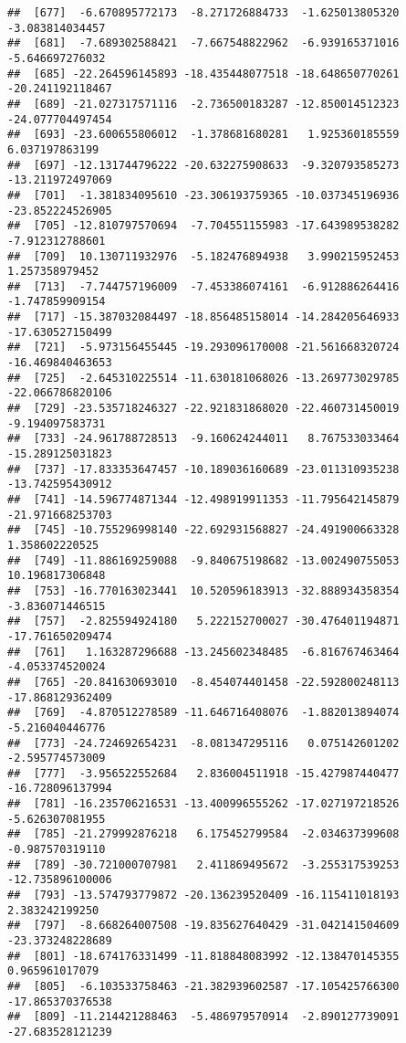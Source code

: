 \documentclass[
]{article}
\begin{document}
\begin{verbatim}
##  [677]  -6.670895772173  -8.271726884733  -1.625013805320  -3.083814034457
##  [681]  -7.689302588421  -7.667548822962  -6.939165371016  -5.646697276032
##  [685] -22.264596145893 -18.435448077518 -18.648650770261 -20.241192118467
##  [689] -21.027317571116  -2.736500183287 -12.850014512323 -24.077704497454
##  [693] -23.600655806012  -1.378681680281   1.925360185559   6.037197863199
##  [697] -12.131744796222 -20.632275908633  -9.320793585273 -13.211972497069
##  [701]  -1.381834095610 -23.306193759365 -10.037345196936 -23.852224526905
##  [705] -12.810797570694  -7.704551155983 -17.643989538282  -7.912312788601
##  [709]  10.130711932976  -5.182476894938   3.990215952453   1.257358979452
##  [713]  -7.744757196009  -7.453386074161  -6.912886264416  -1.747859909154
##  [717] -15.387032084497 -18.856485158014 -14.284205646933 -17.630527150499
##  [721]  -5.973156455445 -19.293096170008 -21.561668320724 -16.469840463653
##  [725]  -2.645310225514 -11.630181068026 -13.269773029785 -22.066786820106
##  [729] -23.535718246327 -22.921831868020 -22.460731450019  -9.194097583731
##  [733] -24.961788728513  -9.160624244011   8.767533033464 -15.289125031823
##  [737] -17.833353647457 -10.189036160689 -23.011310935238 -13.742595430912
##  [741] -14.596774871344 -12.498919911353 -11.795642145879 -21.971668253703
##  [745] -10.755296998140 -22.692931568827 -24.491900663328   1.358602220525
##  [749] -11.886169259088  -9.840675198682 -13.002490755053  10.196817306848
##  [753] -16.770163023441  10.520596183913 -32.888934358354  -3.836071446515
##  [757]  -2.825594924180   5.222152700027 -30.476401194871 -17.761650209474
##  [761]   1.163287296688 -13.245602348485  -6.816767463464  -4.053374520024
##  [765] -20.841630693010  -8.454074401458 -22.592800248113 -17.868129362409
##  [769]  -4.870512278589 -11.646716408076  -1.882013894074  -5.216040446776
##  [773] -24.724692654231  -8.081347295116   0.075142601202  -2.595774573009
##  [777]  -3.956522552684   2.836004511918 -15.427987440477 -16.728096137994
##  [781] -16.235706216531 -13.400996555262 -17.027197218526  -5.626307081955
##  [785] -21.279992876218   6.175452799584  -2.034637399608  -0.987570319110
##  [789] -30.721000707981   2.411869495672  -3.255317539253 -12.735896100006
##  [793] -13.574793779872 -20.136239520409 -16.115411018193   2.383242199250
##  [797]  -8.668264007508 -19.835627640429 -31.042141504609 -23.373248228689
##  [801] -18.674176331499 -11.818848083992 -12.138470145355   0.965961017079
##  [805]  -6.103533758463 -21.382939602587 -17.105425766300 -17.865370376538
##  [809] -11.214421288463  -5.486979570914  -2.890127739091 -27.683528121239

\end{verbatim}
\end{document}
